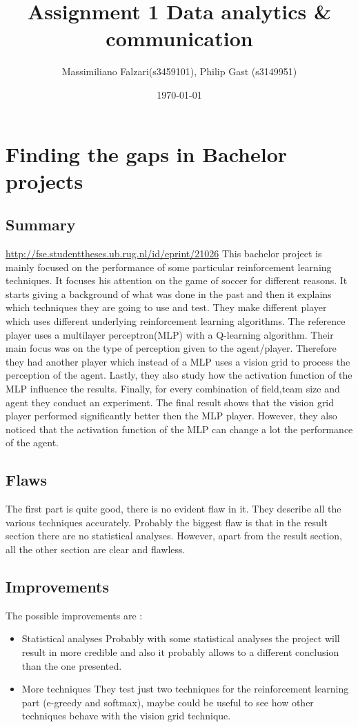 \documentclass[11pt]{article}
\author{Massimiliano Falzari(s3459101),  Philip Gast (s3149951)}
\date{\today}
\title{Assignment 1 Data analytics \& communication}
\begin{document}
\maketitle
\tableofcontents


\section{Finding the gaps in Bachelor projects}
\label{sec:org11e7944}
\subsection{Summary}
\label{sec:org1050e6c}
\url{http://fse.studenttheses.ub.rug.nl/id/eprint/21026}
This bachelor project is mainly focused on the performance of some
particular reinforcement learning techniques.
It focuses his attention on the game of soccer for different
reasons.  It starts giving a background of what was done in the
past and then it explains which techniques they are going to use
and test. They make different player which uses different
underlying reinforcement learning algorithms. The reference player
uses a multilayer perceptron(MLP) with a Q-learning
algorithm. Their main focus was on the type of perception given to
the agent/player. Therefore they had another player which instead
of a MLP uses a vision grid to process the perception of the agent.
Lastly, they also study how the activation function of the MLP
influence the results.
Finally, for every combination of field,team size and
agent they conduct an experiment. The final result shows that the
vision grid player performed significantly better then the MLP
player. However, they also noticed that the activation function of
the MLP can change a lot the performance of the agent.


\subsection{Flaws}
\label{sec:org56bed90}
The first part is quite good, there is no evident flaw in it. They describe all the various techniques accurately.
Probably the biggest flaw is that in the result section there are no statistical analyses.
However, apart from the result section, all the other section are clear and flawless.
\subsection{Improvements}
\label{sec:org8654ff3}
The possible improvements are :
\begin{itemize}
\item Statistical analyses
  Probably with some statistical analyses the project will result in more credible and also it probably allows to a different conclusion than the one presented.
\item More techniques
  They test just two techniques for the reinforcement learning part (e-greedy and softmax),
  maybe could be useful to see how other techniques behave with the vision grid technique.
\end{itemize}
\end{document}

